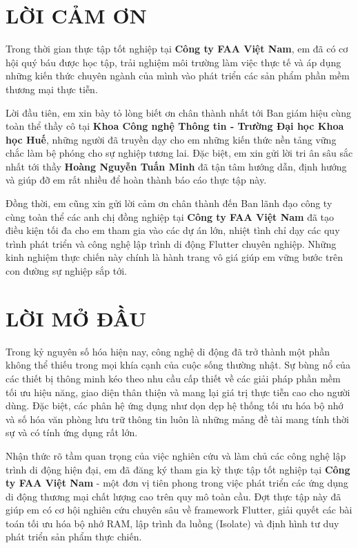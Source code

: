 \documentclass[12pt, a4paper]{article}
\begin{document}
\newpage

\section*{LỜI CẢM ƠN}
Trong thời gian thực tập tốt nghiệp tại \textbf{Công ty FAA Việt Nam}, em đã có cơ hội quý báu được học tập, trải nghiệm môi trường làm việc thực tế và áp dụng những kiến thức chuyên ngành của mình vào phát triển các sản phẩm phần mềm thương mại thực tiễn. 

Lời đầu tiên, em xin bày tỏ lòng biết ơn chân thành nhất tới Ban giám hiệu cùng toàn thể thầy cô tại \textbf{Khoa Công nghệ Thông tin - Trường Đại học Khoa học Huế}, những người đã truyền dạy cho em những kiến thức nền tảng vững chắc làm bệ phóng cho sự nghiệp tương lai. Đặc biệt, em xin gửi lời tri ân sâu sắc nhất tới thầy \textbf{Hoàng Nguyễn Tuấn Minh} đã tận tâm hướng dẫn, định hướng và giúp đỡ em rất nhiều để hoàn thành báo cáo thực tập này.

Đồng thời, em cũng xin gửi lời cảm ơn chân thành đến Ban lãnh đạo công ty cùng toàn thể các anh chị đồng nghiệp tại \textbf{Công ty FAA Việt Nam} đã tạo điều kiện tối đa cho em tham gia vào các dự án lớn, nhiệt tình chỉ dạy các quy trình phát triển và công nghệ lập trình di động Flutter chuyên nghiệp. Những kinh nghiệm thực chiến này chính là hành trang vô giá giúp em vững bước trên con đường sự nghiệp sắp tới.

\newpage

\section*{LỜI MỞ ĐẦU}

Trong kỷ nguyên số hóa hiện nay, công nghệ di động đã trở thành một phần không thể thiếu trong mọi khía cạnh của cuộc sống thường nhật. Sự bùng nổ của các thiết bị thông minh kéo theo nhu cầu cấp thiết về các giải pháp phần mềm tối ưu hiệu năng, giao diện thân thiện và mang lại giá trị thực tiễn cao cho người dùng. Đặc biệt, các phân hệ ứng dụng như dọn dẹp hệ thống tối ưu hóa bộ nhớ và số hóa văn phòng lưu trữ thông tin luôn là những mảng đề tài mang tính thời sự và có tính ứng dụng rất lớn.

Nhận thức rõ tầm quan trọng của việc nghiên cứu và làm chủ các công nghệ lập trình di động hiện đại, em đã đăng ký tham gia kỳ thực tập tốt nghiệp tại \textbf{Công ty FAA Việt Nam} - một đơn vị tiên phong trong việc phát triển các ứng dụng di động thương mại chất lượng cao trên quy mô toàn cầu. Đợt thực tập này đã giúp em có cơ hội nghiên cứu chuyên sâu về framework Flutter, giải quyết các bài toán tối ưu hóa bộ nhớ RAM, lập trình đa luồng (Isolate) và định hình tư duy phát triển sản phẩm thực chiến.
\end{document}
